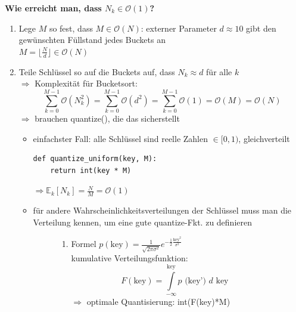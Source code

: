 \documentclass[11pt, fleqn]{scrreprt}
\newcommand{\bigO}[0]{\mathcal{O}}
\begin{document}
\textbf{Wie erreicht man, dass $N_k \in \bigO{}(1)$?}
\begin {enumerate}
    \item Lege $M$ so fest, dass $M \in \bigO{}(N)$: externer Parameter $d \approx 10$ gibt den gewünschten Füllstand jedes Buckets an \\
    \hspace*{3cm} $M = \lfloor \frac{N}{d} \rfloor \in \bigO{}(N)$

    \item Teile Schlüssel so auf die Buckets auf, dass $N_k \approx d$ für alle $k$ \\
    $\Rightarrow$ Komplexität für Bucketsort:
    \[ \sum_{k=0}^{M-1} \bigO{}(N_k^2) = \sum_{k=0}^{M-1} \bigO{}(d^2) = \sum_{k=0}^{M-1} \bigO{}(1) = \bigO{}(M) = \bigO{}(N)\]
    $\Rightarrow$ brauchen quantize(), die das sicherstellt
    \begin{itemize}
        \item einfachster Fall: alle Schlüssel sind reelle Zahlen $\in [0, 1)$, gleichverteilt
        \begin{verbatim}
def quantize_uniform(key, M):
    return int(key * M)
        \end{verbatim}
        $\Rightarrow \mathbb{E}_k[N_k] = \frac{N}{M} = \bigO{}(1)$

        \item für andere Wahrscheinlichkeitsverteilungen der Schlüssel muss man die Verteilung kennen, um eine gute quantize-Fkt. zu definieren

        \begin{figure}[htbp]
            \begin{minipage}[t]{10cm}
                \centering
                \begin{enumerate}[label={\alph*)}]
                    \item Formel $p(\text{key}) = \frac{1}{\sqrt{2\pi \sigma^2}} e^{-\frac{1}{2} \frac{\text{key}^2}{\sigma^2}}$  \\
                    \vspace*{5mm}
                    kumulative Verteilungsfunktion:
                    \[ F(\text{key}) = \int\limits_{-\infty}^{\text{key}} p\text{ (key') } d \text{ key } \]
                    \vspace*{5mm}
                    $\Rightarrow$ optimale Quantisierung: int(F(key)*M)


\end{enumerate}
\end{minipage}
\end{figure}
\end{itemize}
\end{enumerate}
\end{document}

